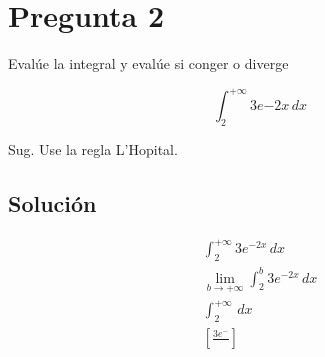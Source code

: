 \section{Pregunta 2}
\noindent Evalúe la integral y evalúe si conger o diverge

\[
  \int_2^{+\infty} 3e{-2x} \, dx
\]

Sug. Use la regla L'Hopital.

\subsection{Solución}

\begin{gather*}
  \int_2^{+\infty} 3e^{-2x} \, dx \\
  \lim_{b \to +\infty} \int_2^b 3e^{-2x} \, dx \\
  \int_2^{+\infty} \, dx \\
  \left[ \frac{3e^{-}}{} \right]
\end{gather*}